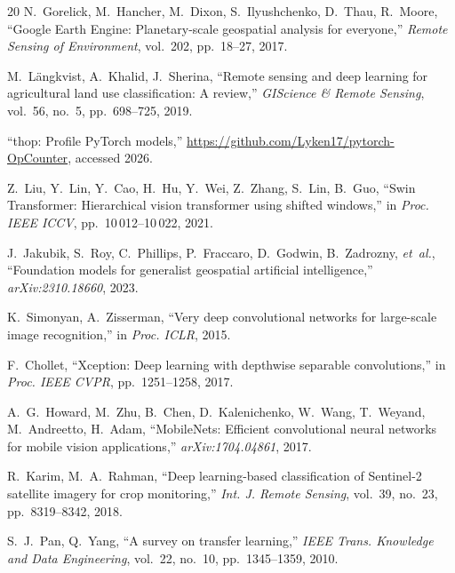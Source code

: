 \documentclass[conference]{IEEEtran}
\begin{document}
\begin{thebibliography}{20}
N.~Gorelick, M.~Hancher, M.~Dixon, S.~Ilyushchenko, D.~Thau,
R.~Moore, ``Google Earth Engine: Planetary-scale geospatial analysis
for everyone,'' \emph{Remote Sensing of Environment}, vol.~202,
pp.~18--27, 2017.

M.~L{\"a}ngkvist, A.~Khalid, J.~Sherina, ``Remote sensing and deep
learning for agricultural land use classification: A review,''
\emph{GIScience \& Remote Sensing}, vol.~56, no.~5, pp.~698--725, 2019.

``thop: Profile PyTorch models,'' \url{https://github.com/Lyken17/pytorch-OpCounter}, accessed 2026.

Z.~Liu, Y.~Lin, Y.~Cao, H.~Hu, Y.~Wei, Z.~Zhang, S.~Lin, B.~Guo,
``Swin Transformer: Hierarchical vision transformer using shifted
windows,'' in \emph{Proc. IEEE ICCV}, pp.~10\,012--10\,022, 2021.

J.~Jakubik, S.~Roy, C.~Phillips, P.~Fraccaro, D.~Godwin, B.~Zadrozny,
\emph{et~al.}, ``Foundation models for generalist geospatial artificial
intelligence,'' \emph{arXiv:2310.18660}, 2023.

K.~Simonyan, A.~Zisserman, ``Very deep convolutional networks for
large-scale image recognition,'' in \emph{Proc. ICLR}, 2015.

F.~Chollet, ``Xception: Deep learning with depthwise separable
convolutions,'' in \emph{Proc. IEEE CVPR}, pp.~1251--1258, 2017.

A.~G.~Howard, M.~Zhu, B.~Chen, D.~Kalenichenko, W.~Wang, T.~Weyand,
M.~Andreetto, H.~Adam, ``MobileNets: Efficient convolutional neural
networks for mobile vision applications,''
\emph{arXiv:1704.04861}, 2017.

R.~Karim, M.~A.~Rahman, ``Deep learning-based classification of
Sentinel-2 satellite imagery for crop monitoring,''
\emph{Int. J. Remote Sensing}, vol.~39, no.~23, pp.~8319--8342, 2018.

S.~J.~Pan, Q.~Yang, ``A survey on transfer learning,''
\emph{IEEE Trans. Knowledge and Data Engineering}, vol.~22, no.~10,
pp.~1345--1359, 2010.

\end{thebibliography}
\end{document}
